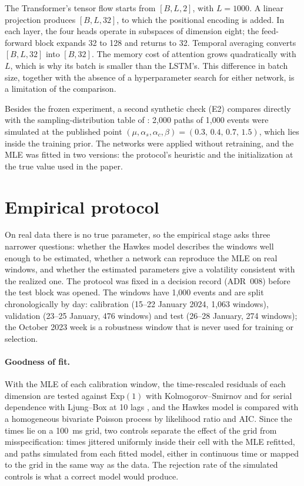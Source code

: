 The Transformer's tensor flow starts from \([B,L,2]\), with \(L=1000\). A linear
projection produces \([B,L,32]\), to which the positional encoding is added. In each
layer, the four heads operate in subspaces of dimension eight; the feed-forward block
expands 32 to 128 and returns to 32. Temporal averaging converts \([B,L,32]\) into
\([B,32]\). The memory cost of attention grows quadratically with \(L\), which is why
its batch is smaller than the LSTM's. This difference in batch size, together with the
absence of a hyperparameter search for either network, is a limitation of the
comparison.

Besides the frozen experiment, a second synthetic check (E2) compares directly with the sampling-distribution table of \citet{lee2023}: 2,000
paths of 1,000 events were simulated at the published point
\((\mu,\alpha_s,\alpha_c,\beta)=(0.3,\,0.4,\,0.7,\,1.5)\), which lies inside the
training prior. The networks were applied without retraining, and the MLE was fitted
in two versions: the protocol's heuristic and the initialization at the true value
used in the paper.

\section{Empirical protocol}
\label{sec:empirical-protocol}

On real data there is no true parameter, so the empirical stage asks three narrower
questions: whether the Hawkes model describes the windows well enough to be estimated, whether
a network can reproduce the MLE on real windows, and whether the estimated parameters give a
volatility consistent with the realized one. The protocol was fixed in a decision record
(ADR~008) before the test block was opened. The windows have 1,000 events and are split
chronologically by day: calibration (15--22 January 2024, 1,063 windows), validation (23--25
January, 476 windows) and test (26--28 January, 274 windows); the October 2023 week is a
robustness window that is never used for training or selection.

\paragraph{Goodness of fit.} With the MLE of each calibration window, the time-rescaled
residuals of each dimension are tested against \(\mathrm{Exp}(1)\) with Kolmogorov--Smirnov and
for serial dependence with Ljung--Box at 10 lags \citep{ogata1988,brown2002}, and the Hawkes
model is compared with a homogeneous bivariate Poisson process by likelihood ratio and AIC.
Since the times lie on a 100~ms grid, two controls separate the effect of the grid from
misspecification: times jittered uniformly inside their cell with the MLE refitted, and paths
simulated from each fitted model, either in continuous time or mapped to the grid in the same
way as the data. The rejection rate of the simulated controls is what a correct model would
produce.

